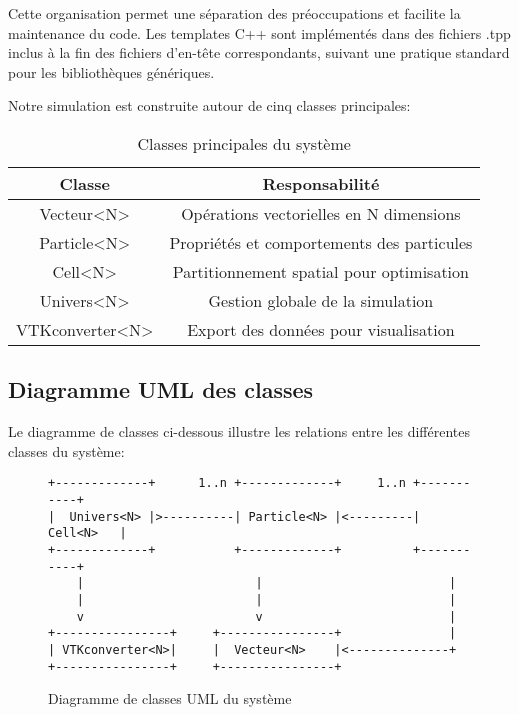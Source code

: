 \documentclass[12pt,a4paper]{article}
\begin{document}
Cette organisation permet une séparation des préoccupations et facilite la maintenance du code. Les templates C++ sont implémentés dans des fichiers .tpp inclus à la fin des fichiers d'en-tête correspondants, suivant une pratique standard pour les bibliothèques génériques.

Notre simulation est construite autour de cinq classes principales:

\begin{table}[H]
\centering
\begin{tabular}{|c|c|}
\hline
\textbf{Classe} & \textbf{Responsabilité} \\
\hline
Vecteur<N> & Opérations vectorielles en N dimensions \\
\hline
Particle<N> & Propriétés et comportements des particules \\
\hline
Cell<N> & Partitionnement spatial pour optimisation \\
\hline
Univers<N> & Gestion globale de la simulation \\
\hline
VTKconverter<N> & Export des données pour visualisation \\
\hline
\end{tabular}
\caption{Classes principales du système}
\end{table}

\subsection{Diagramme UML des classes}

Le diagramme de classes ci-dessous illustre les relations entre les différentes classes du système:

\begin{figure}[H]
\centering
\begin{minipage}{\textwidth}
\begin{verbatim}
+-------------+      1..n +-------------+     1..n +-----------+
|  Univers<N> |>----------| Particle<N> |<---------| Cell<N>   |
+-------------+           +-------------+          +-----------+
    |                        |                          |
    |                        |                          |
    v                        v                          |
+----------------+     +----------------+               |
| VTKconverter<N>|     |  Vecteur<N>    |<--------------+
+----------------+     +----------------+
\end{verbatim}
\end{minipage}
\caption{Diagramme de classes UML du système}
\end{figure}
\end{document}
